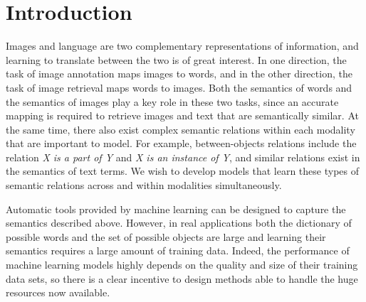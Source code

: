 \section{Introduction}


Images and language are two complementary representations of
information, and learning to translate between the two is of great
interest. In one direction, the task of image annotation maps images
to words, and in the other direction, the task of image retrieval maps
words to images. Both the semantics of words and the semantics of
images play a key role in these two tasks, since an accurate mapping
is required to retrieve images and text that are semantically similar. At
the same time, there also exist complex semantic relations within each
modality that are important to model.  For example, between-objects
relations include the relation {\em X is a part of Y} and {\em X is an
instance of Y}, and similar relations exist in the semantics of text
terms. We wish to develop models that learn these types of semantic
relations across and within modalities simultaneously.


Automatic tools provided by machine learning
can be designed to capture
the semantics described above.  However, in real applications both the
dictionary of possible words and the set of possible objects are large
and learning their semantics requires a large amount of training
data. Indeed, the performance of machine learning models highly
depends on the quality and size of their training data sets, so there
is a clear incentive to design methods able to handle the huge
resources now available.

